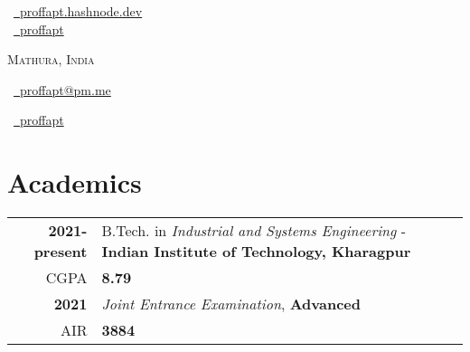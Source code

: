 \documentclass[a4paper,10pt]{extarticle} %
\begin{document}
\pagestyle{empty} %

\begin{multicols}{3}

\normalsize  \faGlobe\ {\href{https://proffapt.hashnode.dev/}{\  proffapt.hashnode.dev}}\\
\normalsize \faGithub\ {\href{https://github.com/proffapt}{\  proffapt}}\\
\columnbreak
\normalsize\par{\centering{\huge\textsc{\textcolor{primary}{Arpit Bhardwaj}}}\par} 
\par{\centering\normalsize {\textsc{Mathura, India}}\hfill\par}
\columnbreak
\raggedright\hfill\normalsize \faEnvelope\ {\href{mailto:proffapt@pm.me}{\  proffapt@pm.me}}\\
\raggedright\hfill\normalsize \faLinkedinSquare\ {\href{https://www.linkedin.com/in/proffapt}{\  proffapt}}\\
\end{multicols}
\vspace{-0.4 cm}

\section{\textcolor{primary}{Academics}}
\vspace{+0.1cm}

\begin{tabular}{r|p{17.5cm}}	

 \textbf{2021-present} & B.Tech. in \textit{Industrial and Systems Engineering} - \textbf{Indian Institute of Technology, Kharagpur}\\
 \hfill CGPA & \textbf{8.79}\\
 \textbf{2021} & \textit{Joint Entrance Examination}, \textbf{Advanced}\\
 \hfill AIR & \textbf{3884}\\
 
\end{tabular}
\end{document}
